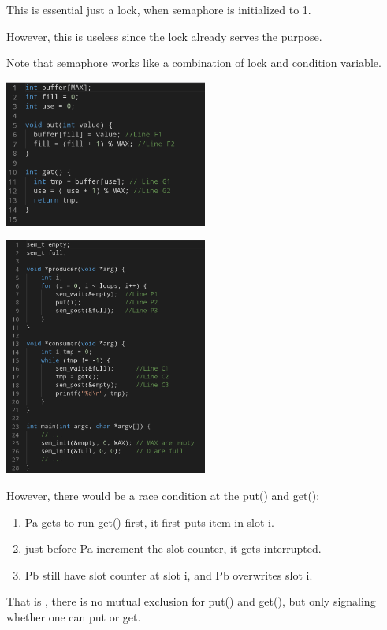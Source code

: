     This is essential just a lock, when semaphore is initialized to 1.

    However, this is useless since the lock already serves the purpose.


    Note that semaphore works like a combination of lock and condition variable.

    \includegraphics[width=0.5\textwidth]{chapters/Cucurrency/Cucurrency/pc_semaphore_get_put.png}

    \includegraphics[width=0.5\textwidth]{chapters/Cucurrency/Cucurrency/pc_semaphore.png}

    However, there would be a race condition at the put() and get():
    \begin{enumerate}
        \item Pa gets to run get() first, it first puts item in slot i.
        \item just before Pa increment the slot counter, it gets interrupted.
        \item Pb still have slot counter at slot i, and Pb overwrites slot i.
    \end{enumerate}

    That is , there is no mutual exclusion for put() and get(), but only signaling
    whether one can put or get.

